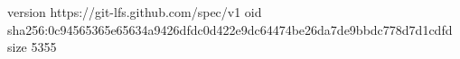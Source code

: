 version https://git-lfs.github.com/spec/v1
oid sha256:0c94565365e65634a9426dfdc0d422e9dc64474be26da7de9bbdc778d7d1cdfd
size 5355
